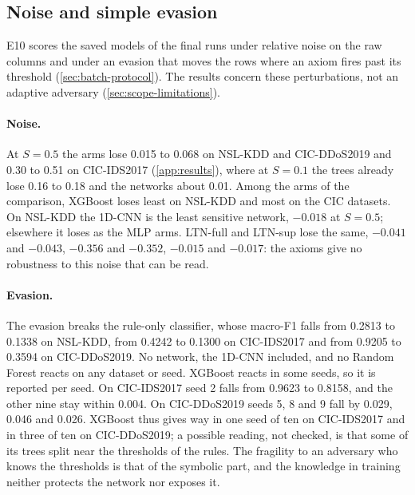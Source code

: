 \subsection{Noise and simple evasion}
\label{sec:res-noise}

E10 scores the saved models of the final runs under relative noise on the raw columns and under an evasion that moves the
rows where an axiom fires past its threshold (\cref{sec:batch-protocol}). The results concern these perturbations, not an
adaptive adversary (\cref{sec:scope-limitations}).

\paragraph{Noise.}
At $S=0.5$ the arms lose 0.015 to 0.068 on NSL-KDD and CIC-DDoS2019 and 0.30 to 0.51 on CIC-IDS2017 (\cref{app:results}),
where at $S=0.1$ the trees already lose 0.16 to 0.18 and the networks about 0.01. Among the arms of the comparison, XGBoost loses least on
NSL-KDD and most on the CIC datasets. On NSL-KDD the 1D-CNN is the least sensitive network, $-0.018$ at $S=0.5$; elsewhere it loses as the MLP
arms. LTN-full and LTN-sup lose the same, $-0.041$ and $-0.043$, $-0.356$ and $-0.352$, $-0.015$ and $-0.017$: the axioms
give no robustness to this noise that can be read.

\paragraph{Evasion.}
The evasion breaks the rule-only classifier, whose macro-F1 falls from 0.2813 to 0.1338 on NSL-KDD, from 0.4242 to
0.1300 on CIC-IDS2017 and from 0.9205 to 0.3594 on CIC-DDoS2019. No network, the 1D-CNN included, and no Random Forest
reacts on any dataset or seed. XGBoost reacts in some seeds, so it is reported per seed. On CIC-IDS2017 seed 2 falls
from 0.9623 to 0.8158, and the other nine stay within 0.004. On CIC-DDoS2019 seeds 5, 8 and 9 fall by 0.029, 0.046 and
0.026. XGBoost thus gives way in one seed of ten on CIC-IDS2017 and in three of ten on CIC-DDoS2019; a possible
reading, not checked, is that some of its trees split near the thresholds of the rules. The fragility to an adversary
who knows the thresholds is that of the symbolic part, and the knowledge in training neither protects the network nor
exposes it.


